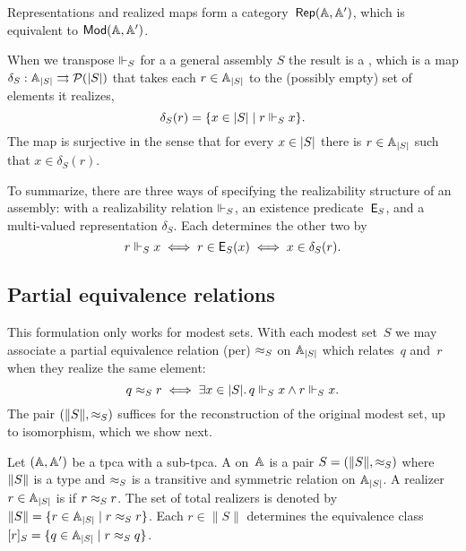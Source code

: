 Representations and realized maps form a category~$\Rep{\AA,\subAA}$, which is equivalent to $\Mod{\AA, \subAA}$.

When we transpose $\rz[S]$ for a a general assembly $S$ the result is a , which is a map $\delta_S : \xAtyp{S} \multito \pow{\S{S}}$ that takes each $r \in \xAtyp{S}$ to the (possibly empty) set of elements it realizes,
%
\begin{equation*}
  \delta_S(r) = \set{ x \in \S{S} \such r \rz[S] x}.
\end{equation*}
%
The map is surjective in the sense that for every $x \in \S{S}$ there is $r \in \xAtyp{S}$ such that $x \in \delta_S(r)$.

To summarize, there are three ways of specifying the realizability structure of an assembly: with a realizability relation $\rz[S]$, an existence predicate~$\Ex{S}$, and a multi-valued representation $\delta_S$. Each determines the other two by
%
\begin{equation*}
  r \rz[S] x \iff
  r \in \Ex{S}(x) \iff
  x \in \delta_S(r).
\end{equation*}


\subsection{Partial equivalence relations}
\label{sec:pers}

This formulation only works for modest sets. With each modest set~$S$ we may associate a partial equivalence relation (per) $\per_S$ on $\xAtyp{S}$ which relates~$q$ and~$r$ when they realize the same element:
%
\begin{equation*}
  q \per_S r \iff
  \some{x \in \S{S}} q \rz[S] x \land r \rz[S] x.
\end{equation*}
%
The pair $(\T{S}, {\per_S})$ suffices for the reconstruction of the
original modest set, up to isomorphism, which we show next.

Let $(\AA, \subAA)$ be a tpca with a sub-tpca. A  on~$\AA$ is a pair $S = (\T{S}, {\per_S})$ where
$\T{S}$ is a type and $\per_S$ is a transitive and symmetric
relation on $\xAtyp{S}$. A realizer $r \in \xAtyp{S}$ is  if
$r \per_S r$. The set of total realizers is denoted by $\|S\| = \set{r
  \in \xAtyp{S} \such r \per_S r}$. Each $r \in \|S\|$ determines
the equivalence class $[r]_S = \set{q \in \xAtyp{S} \such r \per_S q}$.

